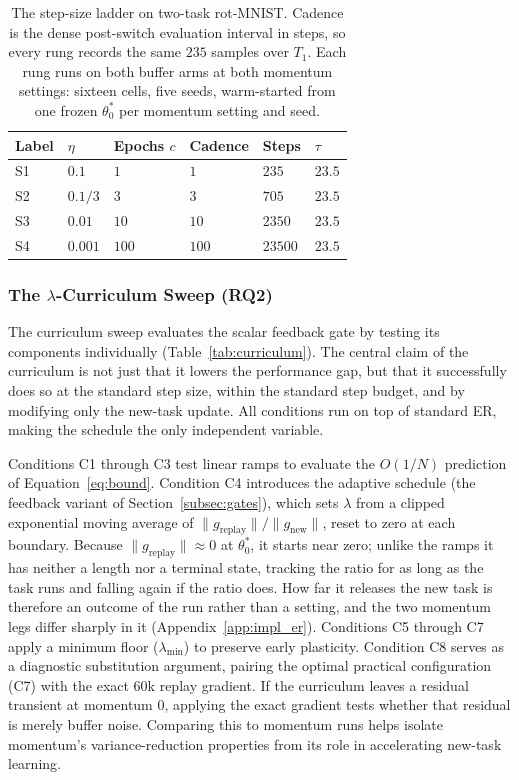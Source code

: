 \begin{table}[b]
    \centering
    \small
    \begin{tabular}{@{}l l l l l l@{}}
        \hline
        Label & $\eta$  & Epochs $c$ & Cadence & Steps   & $\tau$ \\
        \hline
        S1    & $0.1$   & $1$        & $1$     & $235$   & $23.5$ \\
        S2    & $0.1/3$ & $3$        & $3$     & $705$   & $23.5$ \\
        S3    & $0.01$  & $10$       & $10$    & $2350$  & $23.5$ \\
        S4    & $0.001$ & $100$      & $100$   & $23500$ & $23.5$ \\
        \hline
    \end{tabular}
    \caption{The step-size ladder on two-task rot-MNIST. Cadence is the dense post-switch evaluation interval in steps, so every rung records the same $235$ samples over $T_1$. Each rung runs on both buffer arms at both momentum settings: sixteen cells, five seeds, warm-started from one frozen $\theta_0^*$ per momentum setting and seed.}
    \label{tab:ladder}
\end{table}

\subsubsection{The \texorpdfstring{$\lambda$}{lambda}-Curriculum Sweep (RQ2)}
\label{subsec:curriculum}

The curriculum sweep evaluates the scalar feedback gate by testing its components individually (Table~\ref{tab:curriculum}). The central claim of the curriculum is not just that it lowers the performance gap, but that it successfully does so at the standard step size, within the standard step budget, and by modifying only the new-task update. All conditions run on top of standard ER, making the schedule the only independent variable.

Conditions C1 through C3 test linear ramps to evaluate the $O(1/N)$ prediction of Equation~\eqref{eq:bound}. Condition C4 introduces the adaptive schedule (the feedback variant of Section~\ref{subsec:gates}), which sets $\lambda$ from a clipped exponential moving average of $\|g_{\text{replay}}\|/\|g_{\text{new}}\|$, reset to zero at each boundary. Because $\|g_{\text{replay}}\| \approx 0$ at $\theta_0^*$, it starts near zero; unlike the ramps it has neither a length nor a terminal state, tracking the ratio for as long as the task runs and falling again if the ratio does. How far it releases the new task is therefore an outcome of the run rather than a setting, and the two momentum legs differ sharply in it (Appendix~\ref{app:impl_er}). Conditions C5 through C7 apply a minimum floor ($\lambda_{\min}$) to preserve early plasticity. Condition C8 serves as a diagnostic substitution argument, pairing the optimal practical configuration (C7) with the exact $60$k replay gradient. If the curriculum leaves a residual transient at momentum $0$, applying the exact gradient tests whether that residual is merely buffer noise. Comparing this to momentum runs helps isolate momentum's variance-reduction properties from its role in accelerating new-task learning.

